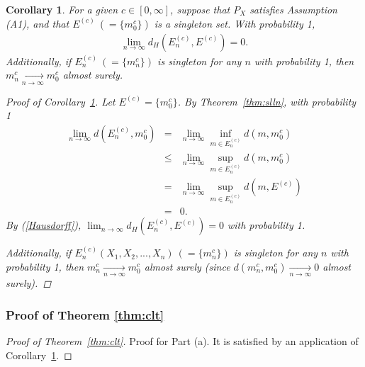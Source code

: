 \documentclass[preprint]{imsart}
\theoremstyle{plain}
\newtheorem{corollary}{Corollary}
\theoremstyle{remark}
\begin{document}
\begin{appendix}
\begin{corollary}\label{a.s.conv}
For a given $c \in [0, \infty]$, suppose that $P_{X}$ satisfies Assumption (A1), and that $E^{(c)} ~ (=\{m^{c}_{0} \})$ is a singleton set. With probability 1,
\begin{eqnarray*}
\lim_{n\rightarrow \infty} d_{H}(E^{(c)}_{n}, E^{(c)})=0.
\end{eqnarray*}
Additionally, if $E^{(c)}_{n} ~ (= \{m^{c}_{n}\})$ is singleton for any $n$ with probability 1, then $m^{c}_{n} \underset{n \rightarrow \infty}{\rightarrow} m^{c}_{0}$ almost surely.
\begin{proof}[Proof of Corollary~\ref{a.s.conv}]
Let $E^{(c)}=\{m^{c}_0\}$. By Theorem~\ref{thm:slln}, with probability 1
\begin{eqnarray*}
\lim_{n\rightarrow \infty} d(E^{(c)}_{n}, m^{c}_0) &=& \lim_{n\rightarrow \infty} \inf_{m \in E^{(c)}_n} d(m, m^{c}_0) \\ 
&\le& \lim_{n\rightarrow \infty} \sup_{m \in E^{(c)}_{n}} d(m, m^{c}_0) \\
&=& \lim_{n\rightarrow \infty} \sup_{m \in E^{(c)}_{n}} d(m, E^{(c)}) \\
&=& 0.
\end{eqnarray*}
By (\ref{Hausdorff}), $\lim_{n\rightarrow \infty} d_{H}(E^{(c)}_n, E^{(c)})=0$ with probability 1. 

Additionally, if $E^{(c)}_{n}(X_{1}, X_{2}, ..., X_{n}) ~ (= \{m^{c}_{n}\})$ is singleton for any $n$ with probability 1, then $m^{c}_{n} \underset{n \rightarrow \infty}{\rightarrow} m^{c}_{0}$ almost surely (since $d(m^{c}_{n}, m^{c}_{0}) \underset{n \rightarrow \infty}{\rightarrow} 0$ almost surely).
\end{proof}
\end{corollary}






\subsubsection{Proof of Theorem \ref{thm:clt}}
\begin{proof}[Proof of Theorem~\ref{thm:clt}]
Proof for Part (a). It is satisfied by an application of Corollary~\ref{a.s.conv}. 


\end{proof}
\end{appendix}
\end{document}
